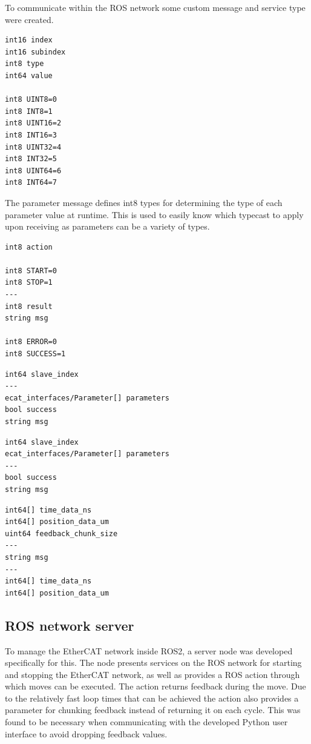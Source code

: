 To communicate within the ROS network some custom message and service type were created. 

\lstset{style=rosdef}
\begin{lstlisting}[caption=Parameter message type,label=lst:ros_interface_msg_parameter]
int16 index
int16 subindex
int8 type
int64 value

int8 UINT8=0
int8 INT8=1
int8 UINT16=2
int8 INT16=3
int8 UINT32=4
int8 INT32=5
int8 UINT64=6
int8 INT64=7
\end{lstlisting}

The parameter message defines int8 types for determining the type of each parameter value at runtime.
This is used to easily know which typecast to apply upon receiving as parameters can be a variety of types.

\begin{lstlisting}[caption=NetworkCtrl service type,label=lst:ros_interface_srv_networkctrl]
int8 action

int8 START=0
int8 STOP=1
---
int8 result
string msg

int8 ERROR=0
int8 SUCCESS=1
\end{lstlisting}

\begin{lstlisting}[caption=GetParameters service type,label=lst:ros_interface_srv_getparameters]
int64 slave_index
---
ecat_interfaces/Parameter[] parameters
bool success
string msg
\end{lstlisting}

\begin{lstlisting}[caption=SetParameters service type,label=lst:ros_interface_srv_setparameters]
int64 slave_index
ecat_interfaces/Parameter[] parameters
---
bool success
string msg
\end{lstlisting}

\begin{lstlisting}[caption=ExecuteMove action type,label=lst:ros_interface_action_executemove]
int64[] time_data_ns
int64[] position_data_um
uint64 feedback_chunk_size
---
string msg
---
int64[] time_data_ns
int64[] position_data_um
\end{lstlisting}

\subsection{ROS network server}

To manage the EtherCAT network inside ROS2, a server node was developed specifically for this. 
The node presents services on the ROS network for starting and stopping the EtherCAT network, as well as provides a ROS action through which moves can be executed. 
The action returns feedback during the move. 
Due to the relatively fast loop times that can be achieved the action also provides a parameter for chunking feedback instead of returning it on each cycle. 
This was found to be necessary when communicating with the developed Python user interface to avoid dropping feedback values. 


